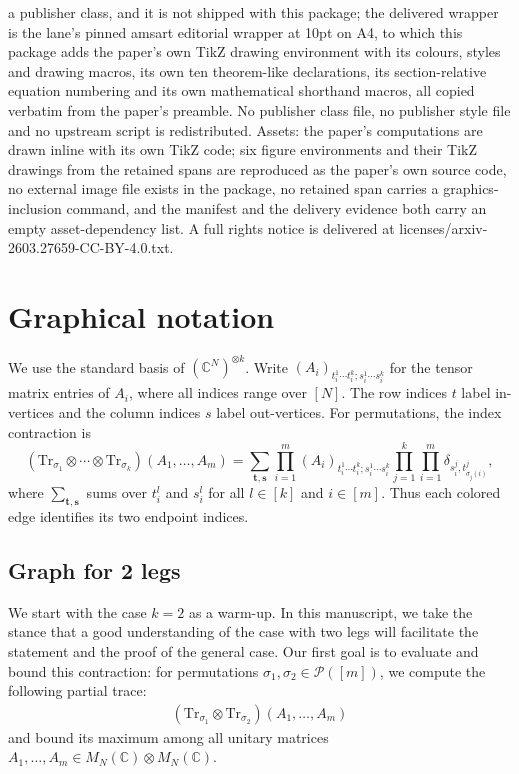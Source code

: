 \documentclass[10pt,a4paper]{amsart}
\numberwithin{equation}{section}
\theoremstyle{plain}
\def\bC{\mathbb C}
\def\cP{\mathcal P}
\def\Tr{\mathrm {Tr}}
\begin{document}
a publisher class, and it is not shipped with this package; the delivered wrapper is the lane's pinned amsart editorial wrapper at 10pt on A4, to which this package adds the paper's own TikZ drawing environment with its colours, styles and drawing macros, its own ten theorem-like declarations, its section-relative equation numbering and its own mathematical shorthand macros, all copied verbatim from the paper's preamble. No publisher class file, no publisher style file and no upstream script is redistributed. Assets: the paper's computations are drawn inline with its own TikZ code; six figure environments and their TikZ drawings from the retained spans are reproduced as the paper's own source code, no external image file exists in the package, no retained span carries a graphics-inclusion command, and the manifest and the delivery evidence both carry an empty asset-dependency list. A full rights notice is delivered at licenses/arxiv-2603.27659-CC-BY-4.0.txt.
\setcounter{section}{1}
\section{Graphical notation} \label{sec:graph}


We use the standard basis of $(\bC^N)^{\otimes k}$. Write
$(A_i)_{t_i^1\cdots t_i^k;s_i^1\cdots s_i^k}$ for the tensor matrix entries of $A_i$, where all indices range over $[N]$. The row indices $t$ label in-vertices and the column indices $s$ label out-vertices. For permutations, the index contraction is
\begin{equation}\label{eq-coordinate-trace}
(\Tr_{\sigma_1}\otimes\cdots\otimes\Tr_{\sigma_k})(A_1,\ldots,A_m)
=\sum_{\mathbf t,\mathbf s}
\prod_{i=1}^m (A_i)_{t_i^1\cdots t_i^k;s_i^1\cdots s_i^k}
\prod_{j=1}^k\prod_{i=1}^m\delta_{s_i^j,t_{\sigma_j(i)}^j},
\end{equation}
where $\sum_{\mathbf t,\mathbf s}$ sums over $t_i^l$ and $s_i^l$ for all $l \in [k]$ and $i \in [m]$.
Thus each colored edge identifies its two endpoint indices.

\subsection{Graph for 2 legs} \label{sec:graph-2 leg}

We start with the case $k=2$ as a warm-up. In this manuscript, we take the stance that a good understanding of the case with two legs will facilitate the statement and the proof of the general case.
Our first goal is to evaluate and bound this contraction: for permutations $\sigma_1, \sigma_2 \in \cP([m])$, we compute the following partial trace:
\begin{align} \label{tr-sigma-tau}
    \left( \Tr_{\sigma_1} \otimes \Tr_{\sigma_2} \right) \left( A_1, \ldots, A_m \right)
\end{align}
and bound its maximum among all unitary matrices $A_1, \ldots, A_m \in M_N (\bC) \otimes M_N(\bC)$.
\end{document}
